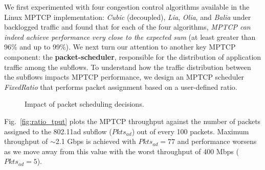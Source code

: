 We first experimented with four congestion control algorithms available in the
Linux MPTCP implementation: \emph{Cubic} (decoupled), \emph{Lia}, 
\emph{Olia}, and \emph{Balia} under backlogged
traffic and found that for each of the four algorithms, \textit{MPTCP
can indeed achieve performance very close to the expected sum} (at
least greater than 96\% and up to 99\%). We next turn our attention to
another key MPTCP component: the \textbf{packet-scheduler},
responsible for the distribution of application traffic among the
subflows. To understand how the traffic distribution between
the subflows impacts MPTCP performance, we design an MPTCP
scheduler \emph{FixedRatio} that performs packet assignment based on a
user-defined ratio.
\begin{figure}[t]
    \centering
    \hfill
    \vspace{-0.2in}
    \caption{Impact of packet scheduling decisions.}
    \vspace{-0.25in}
\end{figure}
Fig.~\ref{fig:ratio_tput} plots the MPTCP throughput against the
number of packets assigned to the 802.11ad subflow ($Pkts_{ad}$) out
of every 100 packets. 
Maximum throughput of $\sim$2.1 Gbps is achieved with $Pkts_{ad}=77$ and performance worsens as we
move away from this value with the worst throughput of 400 Mbps ($Pkts_{ad}=5$).

